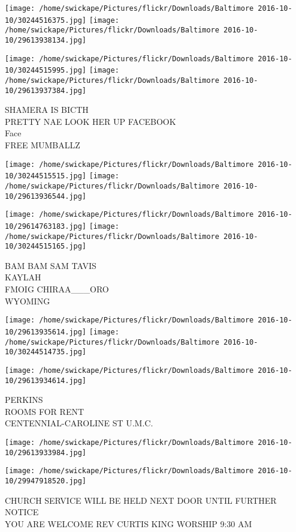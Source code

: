 \documentclass[10pt,letterpaper]{article}
\begin{document}
\texttt{[image: /home/swickape/Pictures/flickr/Downloads/Baltimore 2016-10-10/30244516375.jpg]}
\texttt{[image: /home/swickape/Pictures/flickr/Downloads/Baltimore 2016-10-10/29613938134.jpg]}

\texttt{[image: /home/swickape/Pictures/flickr/Downloads/Baltimore 2016-10-10/30244515995.jpg]}
\texttt{[image: /home/swickape/Pictures/flickr/Downloads/Baltimore 2016-10-10/29613937384.jpg]}

SHAMERA IS BICTH\\
PRETTY NAE LOOK HER UP FACEBOOK\\
Face\\
FREE MUMBALLZ
\pagebreak

\texttt{[image: /home/swickape/Pictures/flickr/Downloads/Baltimore 2016-10-10/30244515515.jpg]}
\texttt{[image: /home/swickape/Pictures/flickr/Downloads/Baltimore 2016-10-10/29613936544.jpg]}

\texttt{[image: /home/swickape/Pictures/flickr/Downloads/Baltimore 2016-10-10/29614763183.jpg]}
\texttt{[image: /home/swickape/Pictures/flickr/Downloads/Baltimore 2016-10-10/30244515165.jpg]}

BAM BAM SAM TAVIS\\
KAYLAH\\
FMOIG CHIRAA\_\_\_ORO\\
WYOMING
\pagebreak

\texttt{[image: /home/swickape/Pictures/flickr/Downloads/Baltimore 2016-10-10/29613935614.jpg]}
\texttt{[image: /home/swickape/Pictures/flickr/Downloads/Baltimore 2016-10-10/30244514735.jpg]}

\vspace{0.25in}
\texttt{[image: /home/swickape/Pictures/flickr/Downloads/Baltimore 2016-10-10/29613934614.jpg]}

PERKINS\\
ROOMS FOR RENT\\
CENTENNIAL{-}CAROLINE ST U.M.C.
\pagebreak

\texttt{[image: /home/swickape/Pictures/flickr/Downloads/Baltimore 2016-10-10/29613933984.jpg]}

\vspace{0.25in}
\texttt{[image: /home/swickape/Pictures/flickr/Downloads/Baltimore 2016-10-10/29947918520.jpg]}

CHURCH SERVICE WILL BE HELD NEXT DOOR UNTIL FURTHER NOTICE\\
YOU ARE WELCOME REV CURTIS KING WORSHIP 9:30 AM
\pagebreak
\end{document}
